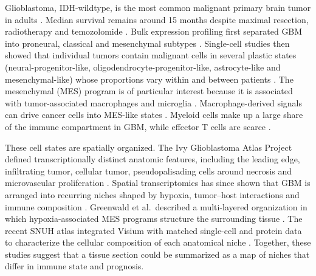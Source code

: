 \documentclass[11pt,letterpaper]{article}
\begin{document}
Glioblastoma, IDH-wildtype, is the most common malignant primary brain tumor in adults \cite{ostrom2023,louis2021}. Median survival remains around 15 months despite maximal resection, radiotherapy and temozolomide \cite{stupp2005}. Bulk expression profiling first separated GBM into proneural, classical and mesenchymal subtypes \cite{verhaak2010,tcga2008}. Single-cell studies then showed that individual tumors contain malignant cells in several plastic states (neural-progenitor-like, oligodendrocyte-progenitor-like, astrocyte-like and mesenchymal-like) whose proportions vary within and between patients \cite{neftel2019}. The mesenchymal (MES) program is of particular interest because it is associated with tumor-associated macrophages and microglia \cite{wang2017}. Macrophage-derived signals can drive cancer cells into MES-like states \cite{hara2021}. Myeloid cells make up a large share of the immune compartment in GBM, while effector T cells are scarce \cite{klemm2020,pomboantunes2021,khan2023,decordova2020,lin2024}.

These cell states are spatially organized. The Ivy Glioblastoma Atlas Project defined transcriptionally distinct anatomic features, including the leading edge, infiltrating tumor, cellular tumor, pseudopalisading cells around necrosis and microvascular proliferation \cite{puchalski2018}. Spatial transcriptomics \cite{stahl2016,moses2022} has since shown that GBM is arranged into recurring niches shaped by hypoxia, tumor--host interactions and immune composition \cite{ravi2022,greenwald2024,ruizmoreno2025}. Greenwald et al.\ described a multi-layered organization in which hypoxia-associated MES programs structure the surrounding tissue \cite{greenwald2024}. The recent SNUH atlas integrated Visium with matched single-cell and protein data to characterize the cellular composition of each anatomical niche \cite{park2026}. Together, these studies suggest that a tissue section could be summarized as a map of niches that differ in immune state and prognosis.
\end{document}
